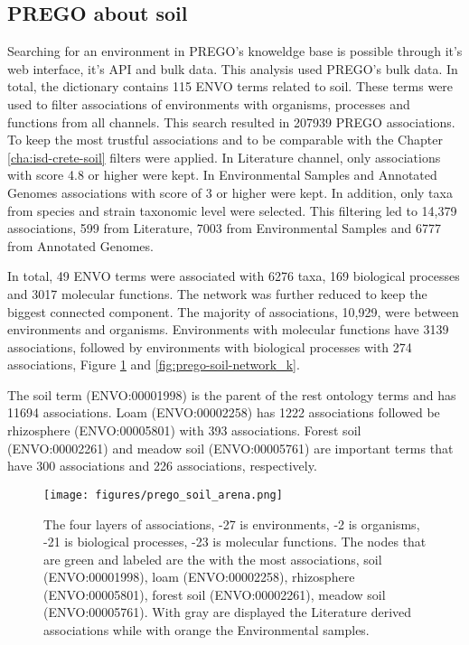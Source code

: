    \subsection{PREGO about soil}
   \label{subsec:prego-soil}

Searching for an environment in PREGO's knoweldge base is possible through
it's web interface, it's API and bulk data. This analysis used PREGO's bulk data. 
In total, the dictionary contains 115 ENVO terms related to soil. These terms were
used to filter associations of environments with organisms, processes and functions 
from all channels. This search resulted in 207939 PREGO associations. 
To keep the most trustful associations and to be comparable with the Chapter \ref{cha:isd-crete-soil}
filters were applied. In Literature channel, only associations with score 4.8 or higher were kept. 
In Environmental Samples and Annotated Genomes associations with score of 3 or higher were kept. 
In addition, only taxa from species and strain taxonomic level were selected.
This filtering led to 14,379 associations, 599 from Literature, 7003 from Environmental
Samples and 6777 from Annotated Genomes.

In total, 49 ENVO terms were associated with 6276 taxa, 169 biological processes
and 3017 molecular functions. The network was further reduced to keep the 
biggest connected component. 
The majority of associations, 10,929, were between environments and organisms.
Environments with molecular functions have 3139 associations, followed by 
environments with biological processes with 274 associations, Figure \ref{fig:prego-soil-network} and \ref{fig:prego-soil-network_k}.

The soil term (ENVO:00001998) is the parent of the rest ontology terms and has 11694 associations.
Loam (ENVO:00002258) has 1222 associations followed be
rhizosphere (ENVO:00005801) with 393 associations.
Forest soil (ENVO:00002261) and meadow soil (ENVO:00005761) are important terms
that have 300 associations and 226 associations, respectively.

   \begin{figure}[hbt!]
      \centering
      \texttt{[image: figures/prego\_soil\_arena.png]}
      \caption[PREGO soil network of literature and environmental samples]{
         The four layers of associations, -27 is environments, -2 is organisms, -21 is biological processes, -23 is molecular functions.
     The nodes that are green and labeled are the with the most associations,
     soil (ENVO:00001998), loam (ENVO:00002258), rhizosphere (ENVO:00005801), forest soil (ENVO:00002261), meadow soil (ENVO:00005761). 
 With gray are displayed the Literature derived associations while with orange the Environmental samples. }
      \label{fig:prego-soil-network}
   \end{figure}
   

